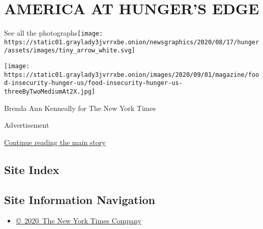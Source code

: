 \hypertarget{america-at-hungers-edge-1}{%
\section{AMERICA AT HUNGER'S EDGE}\label{america-at-hungers-edge-1}}

See all the
photographs\texttt{[image: https://static01.graylady3jvrrxbe.onion/newsgraphics/2020/08/17/hunger/assets/images/tiny\_arrow\_white.svg]}

\texttt{[image: https://static01.graylady3jvrrxbe.onion/images/2020/09/01/magazine/food-insecurity-hunger-us/food-insecurity-hunger-us-threeByTwoMediumAt2X.jpg]}

Brenda Ann Kenneally for The New York Times

Advertisement

\protect\hyperlink{after-bottom}{Continue reading the main story}

\hypertarget{site-index}{%
\subsection{Site Index}\label{site-index}}

\hypertarget{site-information-navigation}{%
\subsection{Site Information
Navigation}\label{site-information-navigation}}

\begin{itemize}
\tightlist
\item
  \href{https://help.nytimes3xbfgragh.onion/hc/en-us/articles/115014792127-Copyright-notice}{©~2020~The
  New York Times Company}
\end{itemize}

